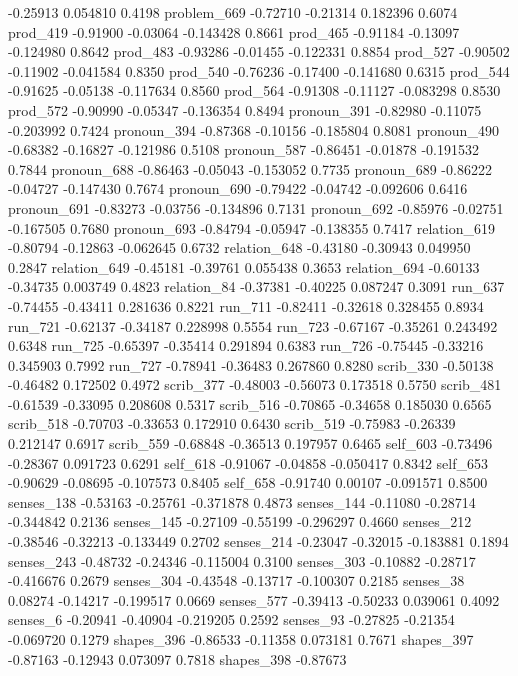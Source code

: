 \documentclass[10pt, letterpaper]{article}
\begin{document}
-0.25913 0.054810 0.4198 problem\_669 -0.72710 -0.21314 0.182396 0.6074
prod\_419 -0.91900 -0.03064 -0.143428 0.8661 prod\_465 -0.91184 -0.13097
-0.124980 0.8642 prod\_483 -0.93286 -0.01455 -0.122331 0.8854 prod\_527
-0.90502 -0.11902 -0.041584 0.8350 prod\_540 -0.76236 -0.17400 -0.141680
0.6315 prod\_544 -0.91625 -0.05138 -0.117634 0.8560 prod\_564 -0.91308
-0.11127 -0.083298 0.8530 prod\_572 -0.90990 -0.05347 -0.136354 0.8494
pronoun\_391 -0.82980 -0.11075 -0.203992 0.7424 pronoun\_394 -0.87368
-0.10156 -0.185804 0.8081 pronoun\_490 -0.68382 -0.16827 -0.121986
0.5108 pronoun\_587 -0.86451 -0.01878 -0.191532 0.7844 pronoun\_688
-0.86463 -0.05043 -0.153052 0.7735 pronoun\_689 -0.86222 -0.04727
-0.147430 0.7674 pronoun\_690 -0.79422 -0.04742 -0.092606 0.6416
pronoun\_691 -0.83273 -0.03756 -0.134896 0.7131 pronoun\_692 -0.85976
-0.02751 -0.167505 0.7680 pronoun\_693 -0.84794 -0.05947 -0.138355
0.7417 relation\_619 -0.80794 -0.12863 -0.062645 0.6732 relation\_648
-0.43180 -0.30943 0.049950 0.2847 relation\_649 -0.45181 -0.39761
0.055438 0.3653 relation\_694 -0.60133 -0.34735 0.003749 0.4823
relation\_84 -0.37381 -0.40225 0.087247 0.3091 run\_637 -0.74455
-0.43411 0.281636 0.8221 run\_711 -0.82411 -0.32618 0.328455 0.8934
run\_721 -0.62137 -0.34187 0.228998 0.5554 run\_723 -0.67167 -0.35261
0.243492 0.6348 run\_725 -0.65397 -0.35414 0.291894 0.6383 run\_726
-0.75445 -0.33216 0.345903 0.7992 run\_727 -0.78941 -0.36483 0.267860
0.8280 scrib\_330 -0.50138 -0.46482 0.172502 0.4972 scrib\_377 -0.48003
-0.56073 0.173518 0.5750 scrib\_481 -0.61539 -0.33095 0.208608 0.5317
scrib\_516 -0.70865 -0.34658 0.185030 0.6565 scrib\_518 -0.70703
-0.33653 0.172910 0.6430 scrib\_519 -0.75983 -0.26339 0.212147 0.6917
scrib\_559 -0.68848 -0.36513 0.197957 0.6465 self\_603 -0.73496 -0.28367
0.091723 0.6291 self\_618 -0.91067 -0.04858 -0.050417 0.8342 self\_653
-0.90629 -0.08695 -0.107573 0.8405 self\_658 -0.91740 0.00107 -0.091571
0.8500 senses\_138 -0.53163 -0.25761 -0.371878 0.4873 senses\_144
-0.11080 -0.28714 -0.344842 0.2136 senses\_145 -0.27109 -0.55199
-0.296297 0.4660 senses\_212 -0.38546 -0.32213 -0.133449 0.2702
senses\_214 -0.23047 -0.32015 -0.183881 0.1894 senses\_243 -0.48732
-0.24346 -0.115004 0.3100 senses\_303 -0.10882 -0.28717 -0.416676 0.2679
senses\_304 -0.43548 -0.13717 -0.100307 0.2185 senses\_38 0.08274
-0.14217 -0.199517 0.0669 senses\_577 -0.39413 -0.50233 0.039061 0.4092
senses\_6 -0.20941 -0.40904 -0.219205 0.2592 senses\_93 -0.27825
-0.21354 -0.069720 0.1279 shapes\_396 -0.86533 -0.11358 0.073181 0.7671
shapes\_397 -0.87163 -0.12943 0.073097 0.7818 shapes\_398 -0.87673
\end{document}
